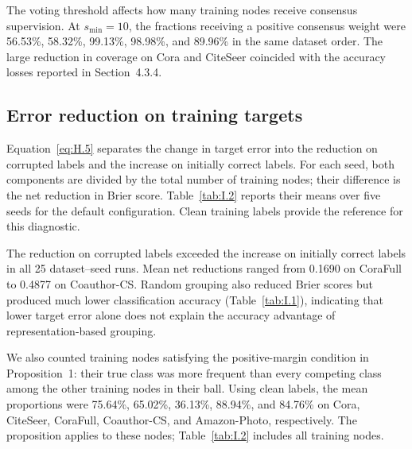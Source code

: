 The voting threshold affects how many training nodes receive consensus supervision. At \(s_{\min}=10\), the fractions receiving a positive consensus weight were 56.53\%, 58.32\%, 99.13\%, 98.98\%, and 89.96\% in the same dataset order. The large reduction in coverage on Cora and CiteSeer coincided with the accuracy losses reported in Section~4.3.4.

\subsection{Error reduction on training targets}\label{sec:I.2}

Equation~\eqref{eq:H.5} separates the change in target error into the reduction on corrupted labels and the increase on initially correct labels. For each seed, both components are divided by the total number of training nodes; their difference is the net reduction in Brier score. Table~\ref{tab:I.2} reports their means over five seeds for the default configuration. Clean training labels provide the reference for this diagnostic.



The reduction on corrupted labels exceeded the increase on initially correct labels in all 25 dataset--seed runs. Mean net reductions ranged from 0.1690 on CoraFull to 0.4877 on Coauthor-CS. Random grouping also reduced Brier scores but produced much lower classification accuracy (Table~\ref{tab:I.1}), indicating that lower target error alone does not explain the accuracy advantage of representation-based grouping.

We also counted training nodes satisfying the positive-margin condition in Proposition~1: their true class was more frequent than every competing class among the other training nodes in their ball. Using clean labels, the mean proportions were 75.64\%, 65.02\%, 36.13\%, 88.94\%, and 84.76\% on Cora, CiteSeer, CoraFull, Coauthor-CS, and Amazon-Photo, respectively. The proposition applies to these nodes; Table~\ref{tab:I.2} includes all training nodes.
